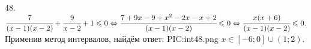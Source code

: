 48. $\cfrac{7}{(x-1)(x-2)}+\cfrac{9}{x-2}+1\leqslant0\Leftrightarrow \cfrac{7+9x-9+x^2-2x-x+2}{(x-1)(x-2)}\leqslant0
\Leftrightarrow \cfrac{x(x+6)}{(x-1)(x-2)}\leqslant0.$ Применив метод интервалов, найдём ответ:
{{PIC:int48.png}}
$x\in[-6;0]\cup(1;2).$\newpage\noindent
